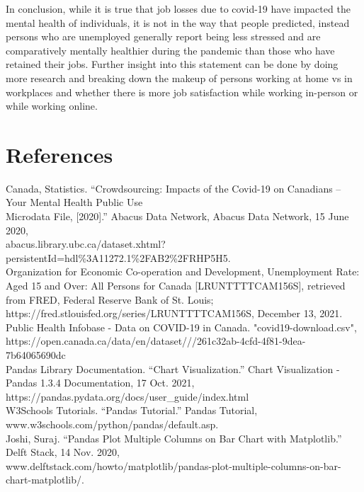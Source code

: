 \documentclass[fontsize=11pt]{article}
\begin{document}
    In conclusion, while it is true that job losses due to covid-19 have impacted the mental health of individuals, it is not in the way that people predicted, instead persons who are unemployed generally report being less stressed and are comparatively mentally healthier during the pandemic than those who have retained their jobs. Further insight into this statement can be done by doing more research and breaking down the makeup of persons working at home vs in workplaces and whether there is more job satisfaction while working in-person or while working online.\\





    \section*{References}
    Canada, Statistics. “Crowdsourcing: Impacts of the Covid-19 on Canadians – Your Mental Health Public Use \\ Microdata File, [2020].” Abacus Data Network, Abacus Data Network, 15 June 2020, \\ abacus.library.ubc.ca/dataset.xhtml?persistentId=hdl\%3A11272.1\%2FAB2\%2FRHP5H5.
    \\

    Organization for Economic Co-operation and Development, Unemployment Rate: Aged 15 and Over: All Persons for Canada [LRUNTTTTCAM156S], retrieved from FRED, Federal Reserve Bank of St. Louis;\\ https://fred.stlouisfed.org/series/LRUNTTTTCAM156S, December 13, 2021.
    \\

    Public Health Infobase - Data on COVID-19 in Canada. "covid19-download.csv",\\ https://open.canada.ca/data/en/dataset///261c32ab-4cfd-4f81-9dea-7b64065690dc
    \\



    Pandas Library Documentation. “Chart Visualization.” Chart Visualization - Pandas 1.3.4 Documentation, 17 Oct. 2021, https://pandas.pydata.org/docs/user\_guide/index.html\\

    W3Schools Tutorials. “Pandas Tutorial.” Pandas Tutorial,\\ www.w3schools.com/python/pandas/default.asp.\\

    Joshi, Suraj. “Pandas Plot Multiple Columns on Bar Chart with Matplotlib.” Delft Stack, 14 Nov. 2020, \\ www.delftstack.com/howto/matplotlib/pandas-plot-multiple-columns-on-bar-chart-matplotlib/. \\
\end{document}
